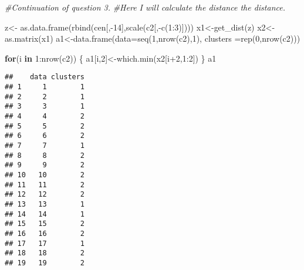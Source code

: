 \documentclass[
]{article}
\newenvironment{Shaded}{\begin{snugshade}}{\end{snugshade}}
\newcommand{\AttributeTok}[1]{\textcolor[rgb]{0.77,0.63,0.00}{#1}}
\newcommand{\CommentTok}[1]{\textcolor[rgb]{0.56,0.35,0.01}{\textit{#1}}}
\newcommand{\ControlFlowTok}[1]{\textcolor[rgb]{0.13,0.29,0.53}{\textbf{#1}}}
\newcommand{\DecValTok}[1]{\textcolor[rgb]{0.00,0.00,0.81}{#1}}
\newcommand{\FunctionTok}[1]{\textcolor[rgb]{0.00,0.00,0.00}{#1}}
\newcommand{\NormalTok}[1]{#1}
\newcommand{\OtherTok}[1]{\textcolor[rgb]{0.56,0.35,0.01}{#1}}
\newcommand{\SpecialCharTok}[1]{\textcolor[rgb]{0.00,0.00,0.00}{#1}}
\begin{document}
\begin{Shaded}
\begin{Highlighting}[]
\CommentTok{\#Continuation of question 3. }
\CommentTok{\#Here I will calculate the distance the distance. }

\NormalTok{z}\OtherTok{\textless{}{-}} \FunctionTok{as.data.frame}\NormalTok{(}\FunctionTok{rbind}\NormalTok{(cen[,}\SpecialCharTok{{-}}\DecValTok{14}\NormalTok{],}\FunctionTok{scale}\NormalTok{(c2[,}\SpecialCharTok{{-}}\FunctionTok{c}\NormalTok{(}\DecValTok{1}\SpecialCharTok{:}\DecValTok{3}\NormalTok{)])))}
\NormalTok{x1}\OtherTok{\textless{}{-}}\FunctionTok{get\_dist}\NormalTok{(z)}
\NormalTok{x2}\OtherTok{\textless{}{-}}\FunctionTok{as.matrix}\NormalTok{(x1)}
\NormalTok{a1}\OtherTok{\textless{}{-}}\FunctionTok{data.frame}\NormalTok{(}\AttributeTok{data=}\FunctionTok{seq}\NormalTok{(}\DecValTok{1}\NormalTok{,}\FunctionTok{nrow}\NormalTok{(c2),}\DecValTok{1}\NormalTok{), }\AttributeTok{clusters =}\FunctionTok{rep}\NormalTok{(}\DecValTok{0}\NormalTok{,}\FunctionTok{nrow}\NormalTok{(c2)))}
               
\ControlFlowTok{for}\NormalTok{(i }\ControlFlowTok{in} \DecValTok{1}\SpecialCharTok{:}\FunctionTok{nrow}\NormalTok{(c2))}
\NormalTok{\{}
\NormalTok{  a1[i,}\DecValTok{2}\NormalTok{]}\OtherTok{\textless{}{-}}\FunctionTok{which.min}\NormalTok{(x2[i}\SpecialCharTok{+}\DecValTok{2}\NormalTok{,}\DecValTok{1}\SpecialCharTok{:}\DecValTok{2}\NormalTok{])}
\NormalTok{\}}
\NormalTok{  a1}
\end{Highlighting}
\end{Shaded}

\begin{verbatim}
##    data clusters
## 1     1        1
## 2     2        1
## 3     3        1
## 4     4        2
## 5     5        2
## 6     6        2
## 7     7        1
## 8     8        2
## 9     9        2
## 10   10        2
## 11   11        2
## 12   12        2
## 13   13        1
## 14   14        1
## 15   15        2
## 16   16        2
## 17   17        1
## 18   18        2
## 19   19        2
\end{verbatim}

\begin{Shaded}
\end{Shaded}
\end{document}
